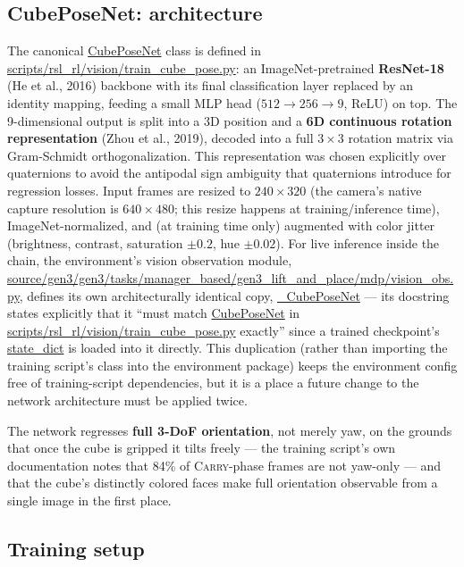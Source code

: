 \documentclass[11pt]{article}
\begin{document}
\subsection{CubePoseNet: architecture}

The canonical \url{CubePoseNet} class is defined in
\url{scripts/rsl_rl/vision/train_cube_pose.py}: an ImageNet-pretrained \textbf{ResNet-18}
(He et al., 2016) backbone with its final
classification layer replaced by an identity mapping, feeding a small MLP head
($512 \to 256 \to 9$, ReLU) on top. The 9-dimensional output is split into a 3D
position and a \textbf{6D continuous rotation representation} (Zhou et al., 2019),
decoded into a full $3\times3$ rotation matrix via
Gram-Schmidt orthogonalization. This representation was chosen explicitly over
quaternions to avoid the antipodal sign ambiguity that quaternions introduce for
regression losses. Input frames are resized to $240\times320$ (the camera's native
capture resolution is $640\times480$; this resize happens at training/inference
time), ImageNet-normalized,
and (at training time only) augmented with color jitter (brightness, contrast,
saturation $\pm0.2$, hue $\pm0.02$). For live inference inside the chain, the
environment's vision observation module,
\url{source/gen3/gen3/tasks/manager_based/gen3_lift_and_place/mdp/vision_obs.py},
defines its own architecturally identical copy, \url{_CubePoseNet} --- its
docstring states explicitly that it ``must match \url{CubePoseNet} in
\url{scripts/rsl_rl/vision/train_cube_pose.py} exactly'' since a trained
checkpoint's \url{state_dict} is loaded into it directly. This duplication
(rather than importing the training script's class into the environment package)
keeps the environment config free of training-script dependencies, but it is a
place a future change to the network architecture must be applied twice.

The network regresses \textbf{full 3-DoF orientation}, not merely yaw, on the
grounds that once the cube is gripped it tilts freely --- the training script's
own documentation notes that 84\% of \textsc{Carry}-phase frames are not
yaw-only --- and that the cube's distinctly colored faces make full orientation
observable from a single image in the first place.

\subsection{Training setup}
\end{document}
